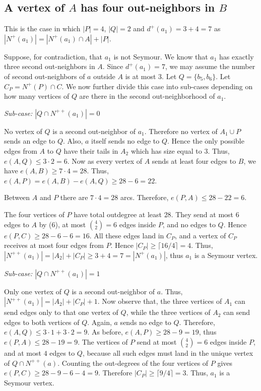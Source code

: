 \documentclass[a4paper,fleqn]{cas-sc}
\theoremstyle{definition}
\begin{document}

\subsection*{A vertex of $A$ has four out-neighbors in $B$}
This is the case in which $|P|=4$, $|Q|=2$ and $d^+(a_1)=3+4=7$ as $|N^+(a_1)|=|N^+(a_1)\cap A|+|P|$.

Suppose, for contradiction, that $a_1$ is not Seymour. We know that $a_1$ has exactly three second out-neighbors in $A$. Since $d^+(a_1)=7$, we may assume the number of second out-neighbors of $a$ outside $A$ is at most $3$. Let $Q=\{b_5,b_6\}$. Let $C_P=N^+(P)\cap C$. We now further divide this case into sub-cases depending on how many vertices of $Q$ are there in the second out-neighborhood of $a_1$.
\medskip

\emph{Sub-case: $|Q\cap N^{++}(a_1)|=0$}


 No vertex of $Q$ is a second out-neighbor of $a_1$. Therefore no vertex of $A_1 \cup P$ sends an edge to $Q$. Also, $a$ itself sends no edge to $Q$. Hence the only possible edges from $A$ to $Q$ have their tails in $A_2$ which has size equal to $3$. Thus, $e(A,Q)\le 3\cdot 2=6$.
Now as every vertex of $A$ sends at least four edges to $B$, we have $e(A,B)\ge 7\cdot 4=28$. Thus, $e(A,P)=e(A,B)-e(A,Q)\ge 28-6=22$.


Between $A$ and $P$ there are $7\cdot 4=28$ arcs. Therefore, $e(P,A)\le 28-22=6$. 

The four vertices of $P$ have total outdegree at least $28$. They send at most $6$ edges to $A$ by (6), at most $\binom{4}{2}=6$ edges inside $P$, and no edges to $Q$. Hence $e(P,C)\ge 28-6-6=16$.
All these edges land in $C_P$, and a vertex of $C_P$ receives at most four edges from $P$. Hence $|C_P|\ge \lceil 16/4\rceil=4$. Thus, $|N^{++}(a_1)|=|A_2|+|C_P|\geq 3+4=7=|N^+(a_1)|$, thus $a_1$ is a Seymour vertex.

\medskip
\emph{Sub-case: $|Q\cap N^{++}(a_1)|=1$}

Only one vertex of $Q$ is a second out-neighbor of $a$. Thus, $|N^{++}(a_1)|=|A_2|+|C_P|+1$. 
Now observe that, the three vertices of $A_1$ can send edges only to that one vertex of $Q$, while the three vertices of $A_2$ can send edges to both vertices of $Q$. Again, $a$ sends no edge to $Q$. Therefore, $e(A,Q)\le 3\cdot 1+3\cdot 2=9$.
As before, $e(A,P)\ge 28-9=19$, thus $e(P,A)\le 28-19=9$. The vertices of $P$ send at most $\binom{4}{2}=6$ edges inside $P$, and at most $4$ edges to $Q$, because all such edges must land in the unique vertex of $Q\cap N^{++}(a)$. Counting the out-degrees of the four vertices of $P$ gives $e(P,C)\ge 28-9-6-4=9$.
Therefore $|C_P|\ge \lceil 9/4\rceil=3$. Thus, $a_1$ is a Seymour vertex.
\end{document}
